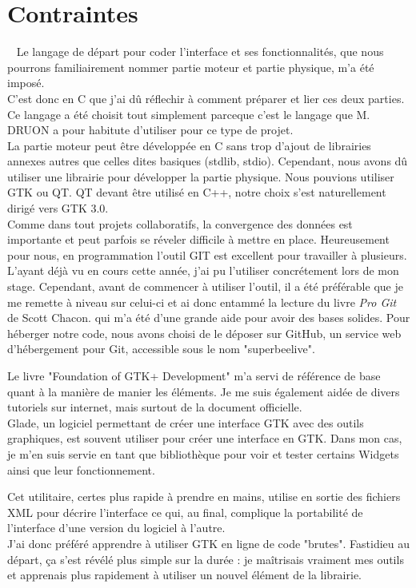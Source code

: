 \documentclass[11pt,french,a4paper]{report}
\begin{document}
    \section{Contraintes} 
Le langage de départ pour coder l'interface et ses fonctionnalités, que nous pourrons familiairement nommer partie moteur 
et partie physique, m'a été imposé. \\
C'est donc en C que j'ai dû réflechir à comment préparer et lier ces deux parties. Ce langage a été choisit tout simplement 
parceque c'est  le langage que M. DRUON a pour habitute d'utiliser pour ce type de projet. \\
La partie moteur peut être développée en C sans trop d'ajout de librairies annexes autres que celles dites basiques 
(stdlib, stdio). 
Cependant, nous avons dû utiliser une librairie pour développer la partie physique. Nous pouvions utiliser GTK ou QT. 
QT devant être utilisé en C++, notre choix s'est naturellement dirigé vers GTK 3.0. \\
Comme dans tout projets collaboratifs, la convergence des données est importante et peut parfois se réveler difficile à mettre en place. 
Heureusement pour nous, en programmation l'outil GIT est excellent pour travailler à plusieurs. L'ayant déjà vu en cours cette année,
j'ai pu l'utiliser concrétement lors de mon stage. Cependant, avant de commencer à utiliser l'outil, il a été préférable que 
je me remette à niveau sur celui-ci et ai donc entammé la lecture du livre \textit{Pro Git} de Scott Chacon. %
qui m'a été d'une grande aide pour avoir des bases solides. Pour héberger notre code, nous avons choisi de le déposer sur GitHub,
un service web d'hébergement pour Git, accessible sous le nom "superbeelive". %

Le livre "Foundation of GTK+ Development" m'a servi de référence de base quant à la manière de manier les éléments. 
Je me suis également aidée de divers tutoriels sur internet, mais surtout de la document officielle. %
\\
Glade, un logiciel permettant de créer une interface GTK avec des outils graphiques, est souvent utiliser pour créer une interface
en GTK.
Dans mon cas, je m'en suis servie en tant que bibliothèque pour voir et tester certains Widgets ainsi que leur fonctionnement.

Cet utilitaire, certes plus rapide à prendre en mains, utilise en sortie des fichiers XML pour décrire l'interface ce qui, 
au final, complique la portabilité de l'interface d'une version du logiciel à l'autre. \\ 
J'ai donc préféré apprendre à utiliser GTK en ligne de code "brutes". Fastidieu au départ, 
ça s'est révélé plus simple sur la durée : je maîtrisais vraiment mes outils et apprenais plus rapidement à utiliser 
un nouvel élément de la librairie.  
\end{document}
